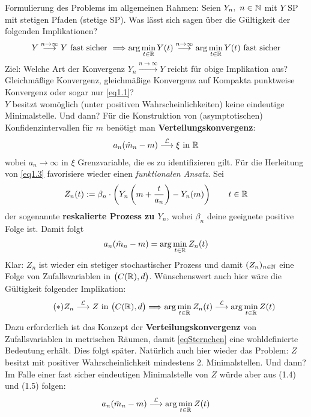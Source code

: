 Formulierung des Problems im allgemeinen Rahmen:
Seien $Y_n,~n\in\mathbb{N}$ mit $Y$ SP mit stetigen Pfaden (stetige SP).
Was lässt sich sagen über die Gültigkeit der folgenden Implikationen?
\begin{align}
Y
\stackrel{n\to\infty}{\longrightarrow}
Y\text{ fast sicher }
\Longrightarrow
\arg\min\limits_{t\in\mathbb{R}} Y(t)
\stackrel{n\to\infty}{\longrightarrow}
\arg\min\limits_{t\in\mathbb{R}} Y(t)\text{ fast sicher}
\end{align}
Ziel: Welche Art der Konvergenz $Y_n\stackrel{n\to\infty}{\longrightarrow} Y$ reicht für obige Implikation aus? Gleichmäßige Konvergenz, gleichmäßige Konvergenz auf Kompakta punktweise Konvergenz oder sogar nur \eqref{eq1.1}?\\
$Y$ besitzt womöglich (unter positiven Wahrscheinlichkeiten) keine eindeutige Minimalstelle. Und dann?\nl
Für die Konstruktion von (asymptotischen) Konfidenzintervallen für $m$ benötigt man \textbf{Verteilungskonvergenz}:
\begin{align}\label{eq1.3}
a_n(\hat{m}_n-m)
\stackrel{\mathcal{L}}{\longrightarrow}\xi\text{ in }\mathbb{R}
\end{align}
wobei $a_n\to\infty$ in $\xi$ Grenzvariable, die es zu identifizieren gilt. Für die Herleitung von \eqref{eq1.3} favorisiere wieder einen \textit{funktionalen Ansatz}. Sei
\begin{align*}
Z_n(t):=\beta_n\cdot\left( Y_n\left(m+\frac{t}{a_n}\right)-Y_n(m)\right)\qquad t\in\mathbb{R}
\end{align*}
der sogenannte \textbf{reskalierte Prozess zu $Y_n$}, wobei $\beta_n$ deine geeignete positive Folge ist. Damit folgt
\begin{align}\label{1.4}
a_n(\hat{m}_n-m)=\arg\min\limits_{t\in\mathbb{R}} Z_n(t)
\end{align}
Klar: $Z_n$ ist wieder ein stetiger stochastischer Prozess und damit $(Z_n)_{n\in\mathbb{N}}$ eine Folge von Zufallsvariablen in $\big(C(\mathbb{R}),d\big)$. Wünschenswert auch hier wäre die Gültigkeit folgender Implikation:
\begin{align}\label{eqSternchen}\tag{$\ast$}
Z_n
\stackrel{\mathcal{L}}{\longrightarrow}
Z\text{ in } \big(C(\mathbb{R}),d\big)
\Longrightarrow
\arg\min\limits_{t\in\mathbb{R}} Z_n(t)
\stackrel{\mathcal{L}}{\longrightarrow}
\arg\min\limits_{t\in\mathbb{R}} Z(t)
\end{align}
Dazu erforderlich ist das Konzept der \textbf{Verteilungskonvergenz} von Zufallsvariablen in metrischen Räumen, damit \eqref{eqSternchen} eine wohldefinierte Bedeutung erhält. Dies folgt später. Natürlich auch hier wieder das Problem: $Z$ besitzt mit positiver Wahrscheinlichkeit mindestens 2. Minimalstellen. Und dann?\nl
Im Falle einer fast sicher eindeutigen Minimalstelle von $Z$ würde aber aus (1.4) und (1.5) folgen:
\begin{align*}
a_n(\hat{m}_n-m)
\stackrel{\mathcal{L}}{\longrightarrow}
\arg\min\limits_{t\in\mathbb{R}} Z(t)
\end{align*}


